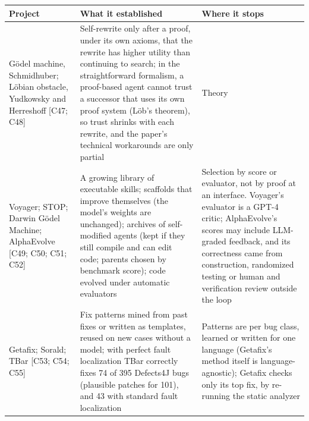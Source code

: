 \documentclass[10pt,letterpaper]{article}
\begin{document}
{\footnotesize\setlength{\tabcolsep}{3.8pt}\renewcommand{\arraystretch}{1.15}
\begin{longtable}[]{@{}
  >{\raggedright\arraybackslash}p{}
  >{\raggedright\arraybackslash}p{}
  >{\raggedright\arraybackslash}p{}@{}}
\toprule\noalign{}
\begin{minipage}[b]{\linewidth}\raggedright
\textbf{Project}
\end{minipage} & \begin{minipage}[b]{\linewidth}\raggedright
\textbf{What it established}
\end{minipage} & \begin{minipage}[b]{\linewidth}\raggedright
\textbf{Where it stops}
\end{minipage} \\
\midrule\noalign{}
\endhead
\bottomrule\noalign{}
\endlastfoot
Gödel machine, Schmidhuber; Löbian obstacle, Yudkowsky and Herreshoff
{[}C47; C48{]} & Self-rewrite only after a proof, under its own axioms,
that the rewrite has higher utility than continuing to search; in the
straightforward formalism, a proof-based agent cannot trust a successor
that uses its own proof system (Löb's theorem), so trust shrinks with
each rewrite, and the paper's technical workarounds are only partial &
Theory \\
Voyager; STOP; Darwin Gödel Machine; AlphaEvolve {[}C49; C50; C51;
C52{]} & A growing library of executable skills; scaffolds that improve
themselves (the model's weights are unchanged); archives of
self-modified agents (kept if they still compile and can edit code;
parents chosen by benchmark score); code evolved under automatic
evaluators & Selection by score or evaluator, not by proof at an
interface. Voyager's evaluator is a GPT-4 critic; AlphaEvolve's scores
may include LLM-graded feedback, and its correctness came from
construction, randomized testing or human and verification review
outside the loop \\
Getafix; Sorald; TBar {[}C53; C54; C55{]} & Fix patterns mined from past
fixes or written as templates, reused on new cases without a model; with
perfect fault localization TBar correctly fixes 74 of 395 Defects4J bugs
(plausible patches for 101), and 43 with standard fault localization &
Patterns are per bug class, learned or written for one language
(Getafix's method itself is language-agnostic); Getafix checks only its
top fix, by re-running the static analyzer \\
\end{longtable}
}
\end{document}
